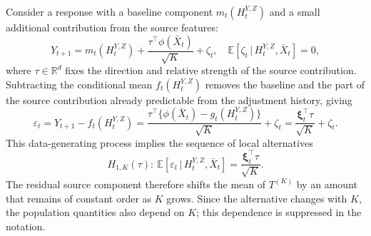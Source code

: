 \documentclass[12pt]{article}
\def\E{\mathbb{E}}
\newcommand\given{\,|\,}
\numberwithin{equation}{section}
\begin{document}
Consider a response with a baseline component
\(m_t(H_t^{Y,Z})\) and a small additional contribution from the source
features:
\begin{equation*}
Y_{t+1}
=
m_t(H_t^{Y,Z})
+
\frac{\tau^\top\phi(\bar X_t)}{\sqrt K}
+
\zeta_t,
\quad
\E[\zeta_t\given H_t^{Y,Z},\bar X_t]=0,
\end{equation*}
where \(\tau\in\mathbb R^d\) fixes the direction and relative strength
of the source contribution. Subtracting the conditional mean
\(f_t(H_t^{Y,Z})\) removes the baseline and the part of the source
contribution already predictable from the adjustment history, giving
\begin{equation*}
\varepsilon_t
=
Y_{t+1}-f_t(H_t^{Y,Z})
=
\frac{\tau^\top\{\phi(\bar X_t)-g_t(H_t^{Y,Z})\}}{\sqrt K}
+\zeta_t
=
\frac{\boldsymbol\xi_t^\top\tau}{\sqrt K}+\zeta_t.
\end{equation*}
This data-generating process implies the sequence of local alternatives
\begin{equation}
\label{eq:local_alt}
    H_{1,K}(\tau):
    ~
    \E[
        \varepsilon_t
        \given
        H_t^{Y,Z},\bar X_t
    ]
    =
    \frac{\boldsymbol{\xi}_t^\top\tau}{\sqrt K}.
\end{equation}
The residual source component therefore shifts the mean of
\(T^{(K)}\) by an amount that remains of constant order as \(K\) grows.
Since the alternative changes with \(K\), the population quantities also
depend on \(K\); this dependence is suppressed in the notation.
\end{document}
